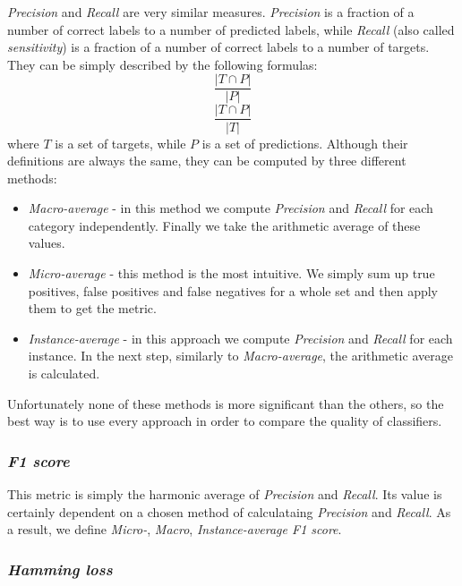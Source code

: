 \textit{Precision} and \textit{Recall} are very similar measures. \textit{Precision} is a fraction of a number of correct labels to a number of predicted labels, while \textit{Recall} (also called \textit{sensitivity}) is a fraction of a number of correct labels to a number of targets. They can be simply described by the following formulas:  
\begin{equation}
\label{eq:exp2}
\frac{|T \cap P|}{|P|}
\end{equation}
\begin{equation}
\label{eq:exp3}
\frac{|T \cap P|}{|T|}
\end{equation}
where $T$ is a set of targets, while $P$ is a set of predictions. Although their definitions are always the same, they can be computed by three different methods:
\begin{itemize}
\item \textit{Macro-average} - in this method we compute \textit{Precision} and \textit{Recall} for each category independently. Finally we take the arithmetic average of these values.
\item \textit{Micro-average} - this method is the most intuitive. We simply sum up true positives, false positives and false negatives for a whole set and then apply them to get the metric. 
\item \textit{Instance-average} - in this approach we compute \textit{Precision} and \textit{Recall} for each instance. In the next step, similarly to \textit{Macro-average}, the arithmetic average is calculated.
\end{itemize}

Unfortunately none of these methods is more significant than the others, so the best way is to use every approach in order to compare the quality of classifiers.  

\subsubsection{\textit{F1 score}}

This metric is simply the harmonic average of \textit{Precision} and \textit{Recall}. Its value is certainly dependent on a chosen method of calculataing \textit{Precision} and \textit{Recall}. As a result, we define \textit{Micro-}, \textit{Macro}, \textit{Instance-average F1 score}. 

\subsubsection{\textit{Hamming loss}}

